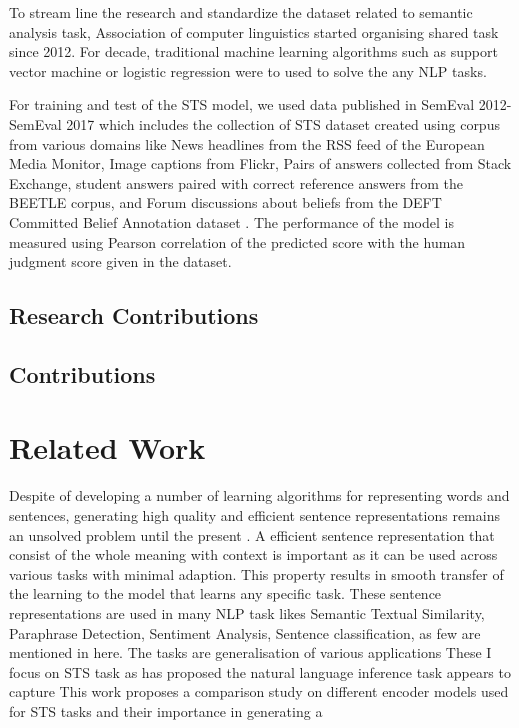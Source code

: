 \documentclass[12pt]{article} %
\begin{document}
 To stream line the research and standardize the dataset related to semantic analysis task, Association of computer linguistics started organising shared task since 2012. For decade, traditional machine learning algorithms such as support vector machine or logistic regression were to used to solve the any NLP tasks.  

For training and test of the STS model, we used data published in SemEval 2012-SemEval 2017 which includes the collection of STS dataset created using corpus from various domains like News headlines from the RSS feed of the European Media Monitor, Image captions from Flickr, Pairs of answers collected from Stack Exchange, student answers paired with correct reference answers from the BEETLE corpus, and Forum discussions about beliefs from the DEFT Committed Belief Annotation dataset \cite{sem-eval2105}. The performance of the model is measured using Pearson correlation of the predicted score with the human judgment score given in the dataset.



\subsection{Research Contributions}
\subsection{Contributions}


\section{Related Work}

Despite of developing a number of learning algorithms for representing words and sentences, generating high quality and efficient sentence representations remains an unsolved problem until the present \citep{conneau2017supervised}. A efficient sentence representation that consist of the whole meaning with context is important as it can be used across various tasks with minimal adaption. This property results in smooth transfer of the learning to the model that learns any specific task. These sentence representations are used in many NLP task likes Semantic Textual Similarity, Paraphrase Detection, Sentiment Analysis, Sentence classification, as few are mentioned in here. The tasks are generalisation of various applications  These  I focus on STS task as \cite{conneau2017supervised} has proposed the natural language inference task appears to capture This work proposes a comparison study on different encoder models used for STS tasks and their importance in generating a  
\end{document}
